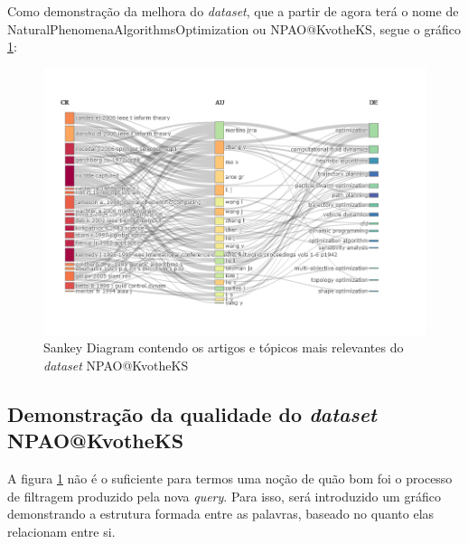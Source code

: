     Como demonstração da melhora do \emph{dataset}, que a partir de agora terá o nome de NaturalPhenomenaAlgorithmsOptimization ou NPAO@KvotheKS, segue o gráfico \ref{fig:KvotheKS:Final_Data_Set}:
    
    \begin{figure}[H]
    \centering
    \includegraphics[width=1.3\textwidth]{experiments/KvotheKS/PesqBibliogr/AlgoritmosSimulacaoOptica-Dinamica/WoS-20220202/Dataset/AU_CR_DE.png}
    \caption{Sankey Diagram contendo os artigos e tópicos mais relevantes do \emph{dataset} NPAO@KvotheKS}
    \label{fig:KvotheKS:Final_Data_Set}
\end{figure}

\subsection{Demonstração da qualidade do \emph{dataset} NPAO@KvotheKS}

    A figura \ref{fig:KvotheKS:Final_Data_Set} não é o suficiente para termos uma noção de quão bom foi o processo de filtragem produzido pela nova \emph{query}. Para isso, será introduzido um gráfico demonstrando a estrutura formada entre as palavras, baseado no quanto elas relacionam entre si.
    

